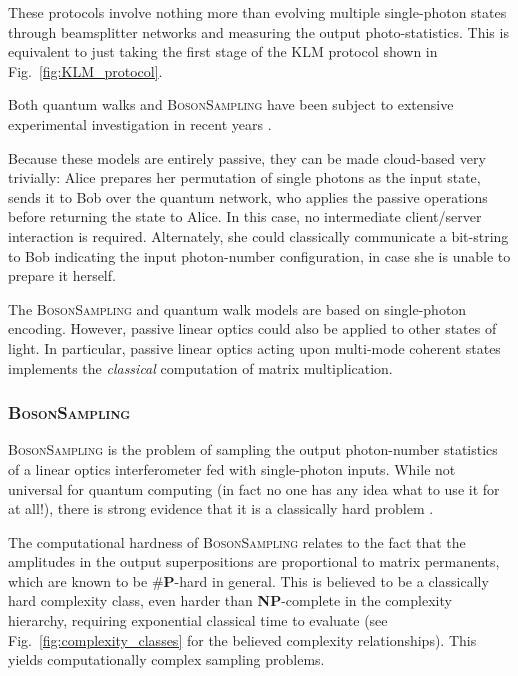 These protocols involve nothing more than evolving multiple single-photon states through beamsplitter networks and measuring the output photo-statistics. This is equivalent to just taking the first stage of the KLM protocol shown in Fig.~\ref{fig:KLM_protocol}.

Both quantum walks and \textsc{BosonSampling} have been subject to extensive experimental investigation in recent years \cite{bib:PeruzzoQW, bib:Broome10, bib:Schreiber11b, bib:Owens11, bib:RohdeQWExp12, bib:Broome2012, bib:RohdeQWExp12, bib:Spring2, bib:Crespi3, bib:Tillmann4}.

Because these models are entirely passive, they can be made cloud-based very trivially: Alice prepares her permutation of single photons as the input state, sends it to Bob over the quantum network, who applies the passive operations before returning the state to Alice. In this case, no intermediate client/server interaction is required. Alternately, she could classically communicate a bit-string to Bob indicating the input photon-number configuration, in case she is unable to prepare it herself.

The \textsc{BosonSampling} and quantum walk models are based on single-photon encoding. However, passive linear optics could also be applied to other states of light. In particular, passive linear optics acting upon multi-mode coherent states implements the \textit{classical} computation of matrix multiplication.

%
%

\subsubsection{\textsc{BosonSampling}} \label{sec:BS} 

\textsc{BosonSampling} is the problem of sampling the output photon-number statistics of a linear optics interferometer fed with single-photon inputs. While not universal for quantum computing (in fact no one has any idea what to use it for at all!), there is strong evidence that it is a classically hard problem \cite{bib:AaronsonArkhipov10, bib:RohdeIntroBS15}.

The computational hardness of \textsc{BosonSampling} relates to the fact that the amplitudes in the output superpositions are proportional to matrix permanents, which are known to be \#\textbf{P}-hard in general. This is believed to be a classically hard complexity class, even harder than \textbf{NP}-complete in the complexity hierarchy, requiring exponential classical time to evaluate (see Fig.~\ref{fig:complexity_classes} for the believed complexity relationships). This yields computationally complex sampling problems.

